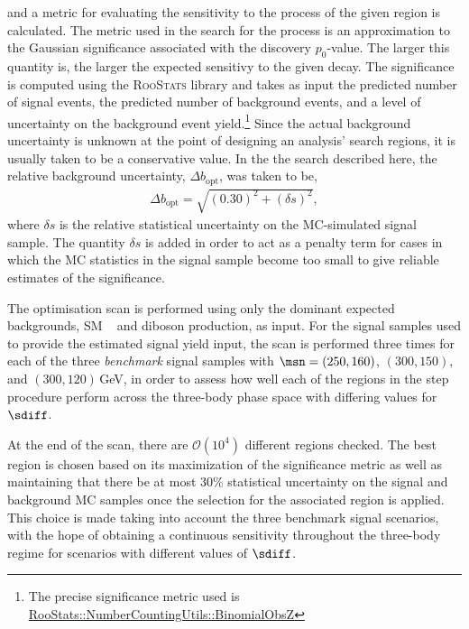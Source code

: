 and a metric for evaluating the sensitivity to the \bWN process of the given region
is calculated.
The metric used in the search for the \bWN process is an approximation to the Gaussian significance
associated with the discovery $p_0$-value.
The larger this quantity is, the larger the expected sensitivy to the given \bWN decay.
The significance is computed using the \textsc{RooStats} library and takes as input
the predicted number of signal events, the predicted number of background events,
and a level of uncertainty on the background event yield.\footnote{The precise
significance metric used is \href{https://root.cern.ch/doc/v606/namespaceRooStats_1_1NumberCountingUtils.html\#a4ac05df7796855dca2d8b24473bf7d4e}{RooStats::NumberCountingUtils::BinomialObsZ} 
}
Since the actual background uncertainty is unknown at the point of designing an analysis'
search regions, it is usually taken to be a conservative value.
In the the search described here, the relative background uncertainty, $\Delta b_{\text{opt}}$, was taken to be,
\begin{align*}
    \Delta b_{\text{opt}} = \sqrt{ (0.30)^2 + (\delta s)^2 },
\end{align*}
where $\delta s$ is the relative statistical uncertainty on the MC-simulated signal sample.
The quantity $\delta s$ is added in order to act as a penalty term for cases in which the
MC statistics in the signal sample become too small to give reliable estimates of the significance.

The optimisation scan is performed using only the dominant expected backgrounds, SM \ttbar~ and diboson production,
as input.
For the signal samples used to provide the estimated signal yield input,
the scan is performed three times for each of the three \textit{benchmark} signal samples with $\msn = (250, 160)$, $(300,150)$, and $(300,120)$\,GeV,
in order to assess how well each of the regions in the step procedure perform
across the three-body phase space with differing values for $\sdiff$.

At the end of the scan, there are $\mathcal{O}(10^4)$ different regions checked.
The best region is chosen based on its maximization of the significance metric as well as
maintaining that there be at most 30\% statistical uncertainty on the signal and background MC samples
once the selection for the associated region is applied.
This choice is made taking into account the three benchmark \bWN signal scenarios, with the hope
of obtaining a continuous sensitivity throughout the three-body regime for scenarios
with different values of $\sdiff$.

